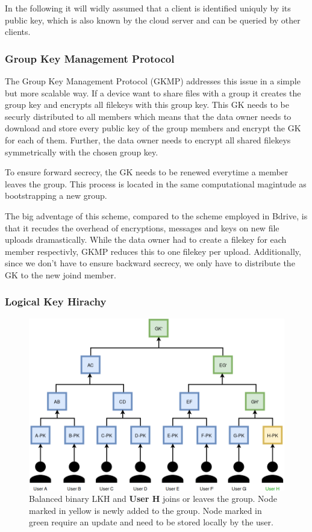 In the following it will widly assumed that a client is identified uniquly by its public key, which is also known by the cloud server and can be queried by other clients. 

\subsubsection{Group Key Management Protocol}
The Group Key Management Protocol (\ac{GKMP})\cite{harney1997group} addresses this issue in a simple but more scalable way. If a device want to share files with a group it creates the group key and encrypts all filekeys with this group key. This \ac{GK} needs to be securly distributed to all members which means that the data owner needs to download and store every public key of the group members and encrypt the \ac{GK} for each of them. Further, the data owner needs to encrypt all shared filekeys symmetrically with the chosen group key. 

To ensure forward secrecy, the \ac{GK} needs to be renewed everytime a member leaves the group. This process is located in the same computational magintude as bootstrapping a new group. 

The big adventage of this scheme, compared to the scheme employed in Bdrive, is that it recudes the overhead of encryptions, messages and keys on new file uploads dramastically. While the data owner had to create a filekey for each member respectivly, \ac{GKMP} reduces this to one filekey per upload. Additionally, since we don't have to ensure backward secrecy, we only have to distribute the \ac{GK} to the new joind member.

\subsubsection{Logical Key Hirachy}
\begin{figure}[!ht]
\centering
    \includegraphics[width=0.8\linewidth]{img/LKH.png}
    \caption{Balanced binary \ac{LKH} and \textbf{User H} joins or leaves the group. Node marked in yellow is newly added to the group. Node marked in green require an update and need to be stored locally by the user.}
    \label{fig:lkh}
\end{figure}

